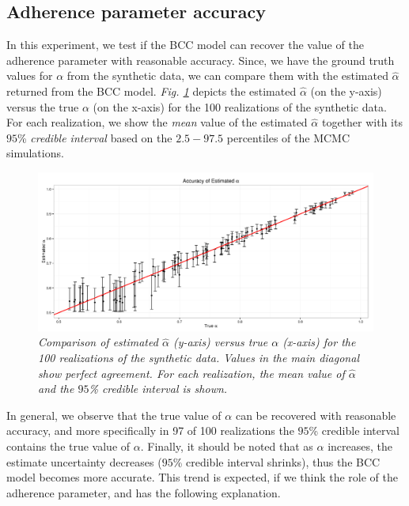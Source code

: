 \subsection{Adherence parameter accuracy } \label{integr-synth-alpha-sect}
In this experiment, we test if the BCC model can recover the value of the adherence parameter with reasonable accuracy. Since, we have the ground truth values for $\alpha$ from the synthetic data, we can compare them with the estimated $\hat{\alpha}$ returned from the BCC model. \emph{Fig. \ref{adherence-test-pic}} depicts the estimated $\hat{\alpha}$ (on the y-axis) versus the true $\alpha$ (on the x-axis) for the 100 realizations of the synthetic data. For each realization, we show the \emph{mean} value of the estimated $\hat{\alpha}$ together with its $95$\% \emph{credible interval} based on the $2.5 - 97.5$ percentiles of the MCMC simulations. 
\begin{figure}[!ht]
\begin{center}
 \includegraphics[scale = 0.41]{images/adherenceTest.png}
\caption{\emph{Comparison of estimated $\hat{\alpha}$ (y-axis) versus true $\alpha$ (x-axis) for the 100 realizations of the synthetic data. Values in the main diagonal show perfect agreement. For each realization, the mean value of $\hat{\alpha}$ and the $95$\% credible interval is shown.}}
\label{adherence-test-pic}
\end{center}
\end{figure}

In general, we observe that the true value of $\alpha$ can be recovered with reasonable accuracy, and more specifically in 97 of 100 realizations the $95$\% credible interval contains the true value of $\alpha$. Finally, it should be noted that as $\alpha$ increases, the estimate uncertainty decreases (\ie $95$\% credible interval shrinks), thus the BCC model becomes more accurate. This trend is expected, if we think the role of the adherence parameter, and has the following explanation. 


